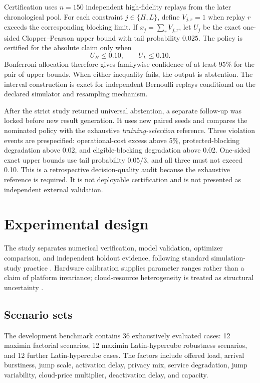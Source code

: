 \documentclass[preprint,12pt]{elsarticle}
\begin{document}
Certification uses $n=150$ independent high-fidelity replays from the later chronological pool. For each constraint $j\in\{H,L\}$, define $V_{j,r}=1$ when replay $r$ exceeds the corresponding blocking limit. If $x_j=\sum_rV_{j,r}$, let $U_j$ be the exact one-sided Clopper--Pearson upper bound with tail probability $0.025$. The policy is certified for the absolute claim only when
\[
U_H\le0.10,\qquad U_L\le0.10.
\]
Bonferroni allocation therefore gives familywise confidence of at least 95\% for the pair of upper bounds. When either inequality fails, the output is abstention. The interval construction is exact for independent Bernoulli replays \cite{clopper1934} conditional on the declared simulator and resampling mechanism.

After the strict study returned universal abstention, a separate follow-up was locked before new result generation. It uses new paired seeds and compares the nominated policy with the exhaustive \emph{training-selection} reference. Three violation events are prespecified: operational-cost excess above 5\%, protected-blocking degradation above 0.02, and eligible-blocking degradation above 0.02. One-sided exact upper bounds use tail probability $0.05/3$, and all three must not exceed 0.10. This is a retrospective decision-quality audit because the exhaustive reference is required. It is not deployable certification and is not presented as independent external validation.

\section{Experimental design}
\label{sec:design}

The study separates numerical verification, model validation, optimizer comparison, and independent holdout evidence, following standard simulation-study practice \cite{sargent2013validation,law2015simulation}. Hardware calibration supplies parameter ranges rather than a claim of platform invariance; cloud-resource heterogeneity is treated as structural uncertainty \cite{zakarya2019heterogeneity}.

\subsection{Scenario sets}

The development benchmark contains 36 exhaustively evaluated cases: 12 maximin factorial scenarios, 12 maximin Latin-hypercube robustness scenarios, and 12 further Latin-hypercube cases. The factors include offered load, arrival burstiness, jump scale, activation delay, privacy mix, service degradation, jump variability, cloud-price multiplier, deactivation delay, and capacity.
\end{document}
